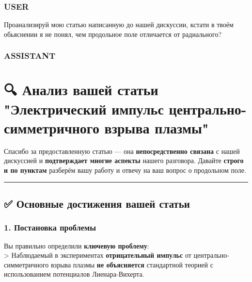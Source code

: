 \documentclass[11pt]{article}
\begin{document}
\subsubsection{USER}\label{user-17}

Проанализируй мою статью написанную до нашей дискуссии, кстати в твоём
обьяснении я не понял, чем продольное поле отличается от радиального?

\subsubsection{ASSISTANT}\label{assistant-17}

\section{🔍 Анализ вашей статьи "Электрический импульс
центрально-симметричного взрыва
плазмы"}\label{ux430ux43dux430ux43bux438ux437-ux432ux430ux448ux435ux439-ux441ux442ux430ux442ux44cux438-ux44dux43bux435ux43aux442ux440ux438ux447ux435ux441ux43aux438ux439-ux438ux43cux43fux443ux43bux44cux441-ux446ux435ux43dux442ux440ux430ux43bux44cux43dux43e-ux441ux438ux43cux43cux435ux442ux440ux438ux447ux43dux43eux433ux43e-ux432ux437ux440ux44bux432ux430-ux43fux43bux430ux437ux43cux44b}

Спасибо за предоставленную статью --- она \textbf{непосредственно
связана} с нашей дискуссией и \textbf{подтверждает многие аспекты}
нашего разговора. Давайте \textbf{строго и по пунктам} разберём вашу
работу и отвечу на ваш вопрос о продольном поле.

\begin{center}\rule{0.5\linewidth}{\linethickness}\end{center}

\subsection{✅ Основные достижения вашей
статьи}\label{ux43eux441ux43dux43eux432ux43dux44bux435-ux434ux43eux441ux442ux438ux436ux435ux43dux438ux44f-ux432ux430ux448ux435ux439-ux441ux442ux430ux442ux44cux438}

\subsubsection{1. Постановка
проблемы}\label{ux43fux43eux441ux442ux430ux43dux43eux432ux43aux430-ux43fux440ux43eux431ux43bux435ux43cux44b}

Вы правильно определили \textbf{ключевую проблему}:\\
\textgreater{} Наблюдаемый в экспериментах \textbf{отрицательный
импульс} от центрально-симметричного взрыва плазмы \textbf{не
объясняется} стандартной теорией с использованием потенциалов
Лиенара-Вихерта.
\end{document}
